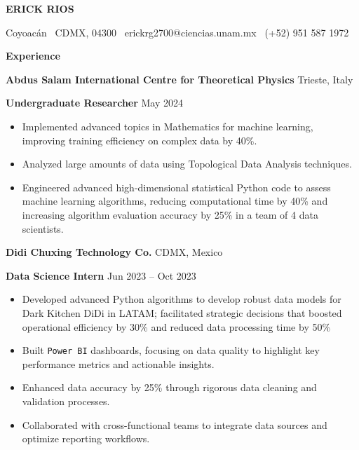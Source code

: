 \documentclass[6pt]{article}
\begin{document}
\begin{center}
    \textbf{ERICK RIOS}\\ 
    \hrulefill
\end{center}

\begin{center}
    Coyoacán \textbullet \ CDMX, 04300 \textbullet \ erickrg2700@ciencias.unam.mx \textbullet \ (+52) 951 587 1972
\end{center}

\vspace{0.5pt}

\begin{center}
    \textbf{Experience}
\end{center}
\textbf{Abdus Salam International Centre for Theoretical Physics} \hfill Trieste, Italy

\textbf{Undergraduate Researcher} \hfill May 2024
\begin{itemize}[noitemsep, topsep=0pt, partopsep=0pt, parsep=0pt]
    \item Implemented advanced topics in Mathematics for machine learning, improving training efficiency on complex data by 40\%.
    \item Analyzed large amounts of data using Topological Data Analysis techniques.
    \item Engineered advanced high-dimensional statistical Python code to assess machine learning algorithms, reducing computational time by 40\% and increasing algorithm evaluation accuracy by 25\% in a team of 4 data scientists.
\end{itemize}

\vspace{12pt}

\textbf{Didi Chuxing Technology Co.} \hfill CDMX, Mexico

\textbf{Data Science Intern} \hfill Jun 2023 – Oct 2023
\begin{itemize}[noitemsep, topsep=0pt, partopsep=0pt, parsep=0pt]
    \item Developed advanced Python algorithms to develop robust data models for Dark Kitchen DiDi in LATAM; facilitated strategic decisions that boosted operational efficiency by 30\% and reduced data processing time by 50\%
    \item Built \texttt{Power BI} dashboards, focusing on data quality to highlight key performance metrics and actionable insights.
    \item Enhanced data accuracy by 25\% through rigorous data cleaning and validation processes.
    \item Collaborated with cross-functional teams to integrate data sources and optimize reporting workflows.
\end{itemize}
\end{document}
